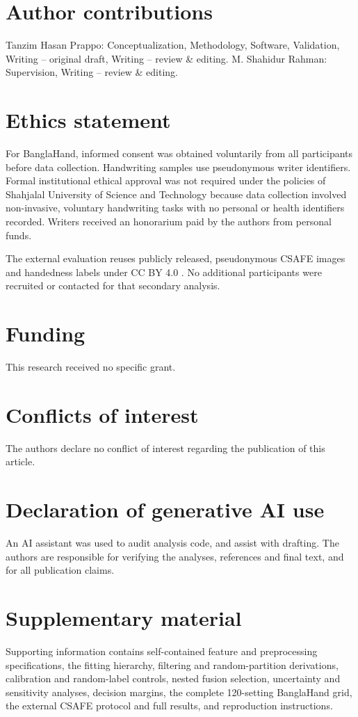 \section*{Author contributions}
Tanzim Hasan Prappo: Conceptualization, Methodology, Software, Validation, Writing -- original draft, Writing -- review \& editing. M. Shahidur Rahman: Supervision, Writing -- review \& editing.

\section*{Ethics statement}
For BanglaHand, informed consent was obtained voluntarily from all participants before data collection. Handwriting samples use pseudonymous writer identifiers. Formal institutional ethical approval was not required under the policies of Shahjalal University of Science and Technology because data collection involved non-invasive, voluntary handwriting tasks with no personal or health identifiers recorded. Writers received an honorarium paid by the authors from personal funds.

The external evaluation reuses publicly released, pseudonymous CSAFE images and handedness labels under CC BY 4.0 \cite{crawford2020database,crawford2026csafe}. No additional participants were recruited or contacted for that secondary analysis.

\section*{Funding}
This research received no specific grant.

\section*{Conflicts of interest}
The authors declare no conflict of interest regarding the publication of this article.

\section*{Declaration of generative AI use}
An AI assistant was used to audit analysis code, and assist with drafting. The authors are responsible for verifying the analyses, references and final text, and for all publication claims.

\section*{Supplementary material}
Supporting information contains self-contained feature and preprocessing specifications, the fitting hierarchy, filtering and random-partition derivations, calibration and random-label controls, nested fusion selection, uncertainty and sensitivity analyses, decision margins, the complete 120-setting BanglaHand grid, the external CSAFE protocol and full results, and reproduction instructions.
